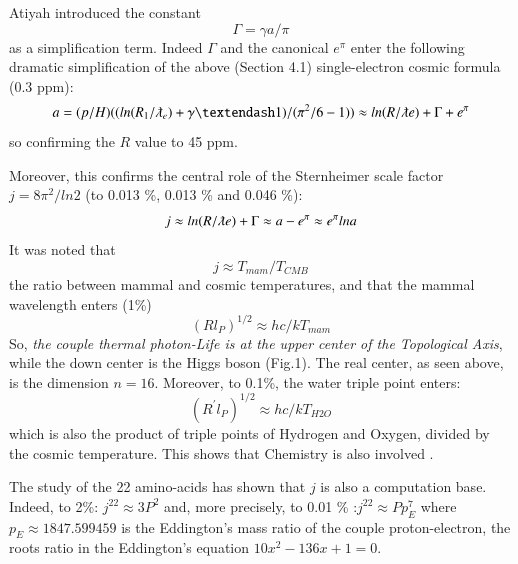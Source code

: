 \documentclass[twoside,draft]{article}
\begin{document}
\begin{sloppypar}
    Atiyah introduced the constant $$\Gamma = \gamma a /\pi$$ as a simplification term. Indeed $\Gamma$ and the canonical $e^{\pi}$ enter the following dramatic simplification of the above (Section 4.1) single-electron cosmic formula (0.3 ppm):    
\begin{equation}
a = (p/H)((ln(R_1/\lambdabar_e) + \gamma – 1)/(\pi^2/6 - 1)) \approx ln(R/\lambdabar e) + \Gamma + e^{\pi}
\end{equation}
so confirming the $R$ value to 45 ppm.

Moreover, this confirms the central role of the Sternheimer scale factor $j = 8\pi^2/ln2$ (to 0.013 \%, 0.013 \% and 0.046 \%):
\begin{equation}
j \approx ln(R/\lambdabar e) + \Gamma \approx a - e^{\pi} \approx e^{\pi} lna
\end{equation}
It was noted \cite{Sanchez1} that $$j\approx T_{mam}/T_{CMB}$$ the ratio between mammal and cosmic temperatures, and that the mammal wavelength enters (1\%) $$(Rl_P)^{1/2}\approx hc/kT_{mam}$$ So, \textit{the couple thermal photon-Life is at the upper center of the Topological Axis}, while the down center is the Higgs boson (Fig.1). The real center, as seen above, is the dimension $n = 16$. Moreover, to 0.1\%, the water triple point enters: $$(R^{\prime}l_P)^{1/2}\approx hc/kT_{H2O}$$ which is also the product of triple points of Hydrogen and Oxygen, divided by the cosmic temperature. This shows that Chemistry is also involved \cite{Sanchez1}.

The study of the 22 amino-acids \cite{Sanchez1} has shown that $j$ is also a computation base. Indeed, to 2\%: $j^{22} \approx 3 P^2 $ and, more precisely, to 0.01 \% :$j^{22} \approx Pp_E^7 $ where $ p_E \approx 1847.599459$ is the Eddington's mass ratio of the couple proton-electron, the roots ratio in the Eddington's equation $10x^2 - 136x + 1 = 0 $.


\end{sloppypar}
\end{document}
